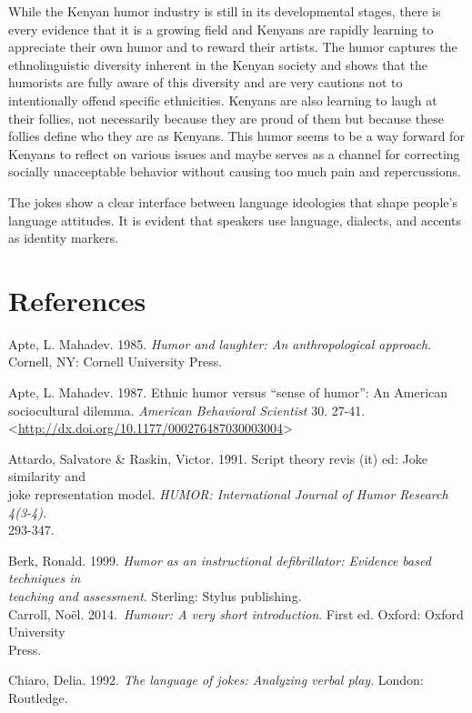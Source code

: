 \documentclass[output=paper]{langsci/langscibook}
\begin{document}
   While the Kenyan humor industry is still in its developmental stages, there is every evidence that it is a growing field and Kenyans are rapidly learning to appreciate their own humor and to reward their artists. The humor captures the ethnolinguistic diversity inherent in the Kenyan society and shows that the humorists are fully aware of this diversity and are very cautions not to intentionally offend specific ethnicities. Kenyans are also learning to laugh at their follies, not necessarily because they are proud of them but because these follies define who they are as Kenyans. This humor seems to be a way forward for Kenyans to reflect on various issues and maybe serves as a channel for correcting socially unacceptable behavior without causing too much pain and repercussions.

   The jokes show a clear interface between language ideologies that shape people’s language attitudes. It is evident that speakers use language, dialects, and accents as identity markers. \\

\section{References }

Apte, L. Mahadev. 1985. \textit{Humor and laughter: An anthropological approach}. Cornell, NY: Cornell University Press.

Apte, L. Mahadev. 1987. Ethnic humor versus “sense of humor”: An American sociocultural dilemma. \textit{American Behavioral Scientist} 30. 27-41. {\textless}\url{http://dx.doi.org/10.1177/000276487030003004}{\textgreater}

Attardo, Salvatore \& Raskin, Victor. 1991. Script theory revis (it) ed: Joke similarity and \\
   joke representation model. \textit{HUMOR: International Journal of Humor Research 4(3-4). \\
   }293-347.

Berk, Ronald. 1999. \textit{Humor as an instructional defibrillator: Evidence based techniques in \\
   }\textit{teaching and assessment}. Sterling: Stylus publishing. \\
Carroll, Noël. 2014.~\textit{Humour: A very short introduction}. First ed. Oxford: Oxford University \\
   Press.

Chiaro, Delia. 1992. \textit{The language of jokes: Analyzing verbal play}. London: Routledge.\\
\end{document}
